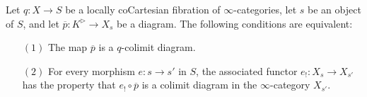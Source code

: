 \begin{proposition}\label{relcolfibtest}
Let $q: X \rightarrow S$ be a locally coCartesian fibration of $\infty$-categories, let $s$ be an object of $S$, and let $\overline{p}: K^{\triangleright} \rightarrow X_{s}$ be a diagram. The following conditions are equivalent:
\begin{itemize}
\item[$(1)$] The map $\overline{p}$ is a $q$-colimit diagram.
\item[$(2)$] For every morphism $e: s \rightarrow s'$ in $S$, the associated functor
$e_{!}: X_{s} \rightarrow X_{s'}$ has the property that $e_{!} \circ \overline{p}$ is a colimit
diagram in the $\infty$-category $X_{s'}$.
\end{itemize}
\end{proposition}

